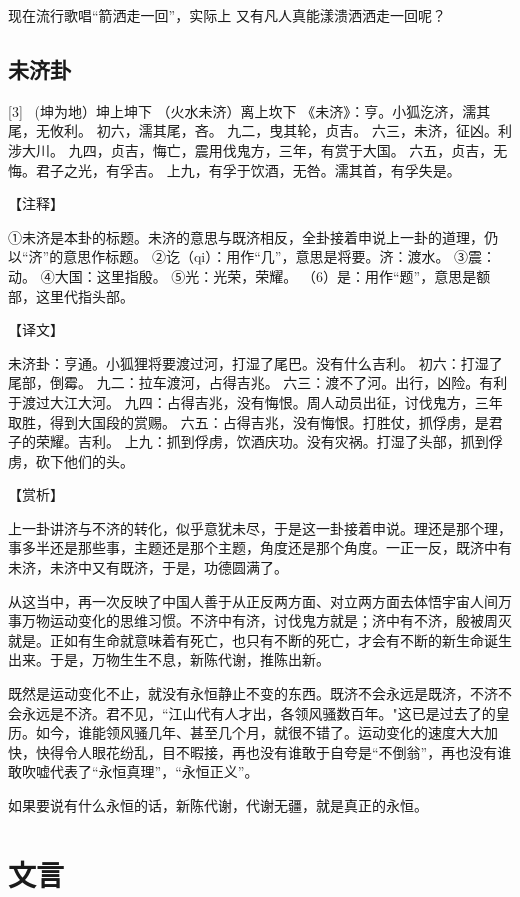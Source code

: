 \documentclass[12pt,UTF8]{ctexbook}
\begin{document}
现在流行歌唱“箭洒走一回”，实际上 又有凡人真能漾溃洒洒走一回呢？

\chapter{未济卦}
[3] \ (坤为地）坤上坤下
（火水未济）离上坎下
《未济》：亨。小狐汔济，濡其尾，无攸利。
初六，濡其尾，吝。
九二，曳其轮，贞吉。
六三，未济，征凶。利涉大川。
九四，贞吉，悔亡，震用伐鬼方，三年，有赏于大国。
六五，贞吉，无悔。君子之光，有孚吉。
上九，有孚于饮酒，无咎。濡其首，有孚失是。

【注释】

①未济是本卦的标题。未济的意思与既济相反，全卦接着申说上一卦的道理，仍以“济”的意思作标题。
②讫（qi）：用作“几”，意思是将要。济：渡水。
③震：动。
④大国：这里指殷。
⑤光：光荣，荣耀。
（6）是：用作“题”，意思是额部，这里代指头部。

【译文】

未济卦：亨通。小狐狸将要渡过河，打湿了尾巴。没有什么吉利。
初六：打湿了尾部，倒霉。
九二：拉车渡河，占得吉兆。
六三：渡不了河。出行，凶险。有利于渡过大江大河。
九四：占得吉兆，没有悔恨。周人动员出征，讨伐鬼方，三年取胜，得到大国段的赏赐。
六五：占得吉兆，没有悔恨。打胜仗，抓俘虏，是君子的荣耀。吉利。
上九：抓到俘虏，饮酒庆功。没有灾祸。打湿了头部，抓到俘虏，砍下他们的头。

【赏析】

上一卦讲济与不济的转化，似乎意犹未尽，于是这一卦接着申说。理还是那个理，事多半还是那些事，主题还是那个主题，角度还是那个角度。一正一反，既济中有未济，未济中又有既济，于是，功德圆满了。

从这当中，再一次反映了中国人善于从正反两方面、对立两方面去体悟宇宙人间万事万物运动变化的思维习惯。不济中有济，讨伐鬼方就是；济中有不济，殷被周灭就是。正如有生命就意味着有死亡，也只有不断的死亡，才会有不断的新生命诞生出来。于是，万物生生不息，新陈代谢，推陈出新。

既然是运动变化不止，就没有永恒静止不变的东西。既济不会永远是既济，不济不会永远是不济。君不见，“江山代有人才出，各领风骚数百年。"这已是过去了的皇历。如今，谁能领风骚几年、甚至几个月，就很不错了。运动变化的速度大大加快，快得令人眼花纷乱，目不暇接，再也没有谁敢于自夸是“不倒翁”，再也没有谁敢吹嘘代表了“永恒真理”，“永恒正义”。

如果要说有什么永恒的话，新陈代谢，代谢无疆，就是真正的永恒。

\part{文言}
\end{document}
